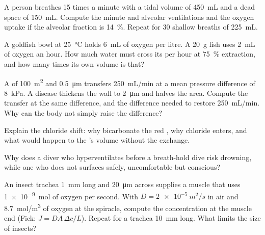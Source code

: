 \begin{exercise}[$\star\star$]\label{exo:b1:gas-exchange:5}
A person breathes \qty{15}{} times a minute with a tidal volume of
\qty{450}{mL} and a dead space of \qty{150}{mL}. Compute the minute and
alveolar ventilations and the oxygen uptake if the alveolar fraction
is \qty{14}{\%}. Repeat for \qty{30}{} shallow breaths of \qty{225}{mL}.
\end{exercise}

\begin{exercise}[$\star\star$]\label{exo:b1:gas-exchange:6}
A goldfish bowl at \qty{25}{\celsius} holds \qty{6}{mL} of oxygen per
litre. A \qty{20}{g} fish uses \qty{2}{mL} of oxygen an hour. How much
water must cross its  per hour at \qty{75}{\%} extraction, and
how many times its own volume is that?
\end{exercise}

\begin{exercise}[$\star\star$]\label{exo:b1:gas-exchange:7}
A  of \qty{100}{m^2} and \qty{0.5}{\micro m} transfers
\qty{250}{mL/min} at a mean pressure difference of \qty{8}{kPa}. A
disease thickens the wall to \qty{2}{\micro m} and halves the area.
Compute the transfer at the same difference, and the difference needed
to restore \qty{250}{mL/min}. Why can the body not simply raise the
difference?
\end{exercise}

\begin{exercise}[$\star\star$]\label{exo:b1:gas-exchange:8}
Explain the chloride shift: why bicarbonate  the red , why
chloride enters, and what would happen to the 's volume without
the exchange.
\end{exercise}

\begin{exercise}[$\star\star$]\label{exo:b1:gas-exchange:9}
Why does a diver who hyperventilates before a breath-hold dive risk
drowning, while one who does not surfaces safely, uncomfortable but
conscious?
\end{exercise}

\begin{exercise}[$\star\star\star$]\label{exo:b1:gas-exchange:10}
An insect trachea \qty{1}{mm} long and \qty{20}{\micro m} across
supplies a muscle that uses \qty{1e-9}{mol} of oxygen per second.
With $D = \qty{2e-5}{m^2/s}$ in air and \qty{8.7}{mol/m^3} of oxygen
at the spiracle, compute the concentration at the muscle end (Fick:
$J = DA\,\Delta c/L$). Repeat for a trachea \qty{10}{mm} long. What
limits the size of insects?
\end{exercise}

